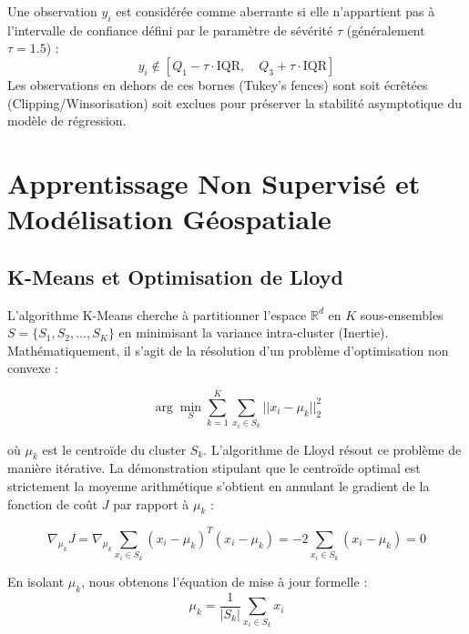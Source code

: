 \documentclass[11pt,a4paper,twoside]{report}
\begin{document}
Une observation $y_i$ est considérée comme aberrante si elle n'appartient pas à l'intervalle de confiance défini par le paramètre de sévérité $\tau$ (généralement $\tau=1.5$) :
\begin{equation}
y_i \notin \left[ Q_1 - \tau \cdot \text{IQR}, \quad Q_3 + \tau \cdot \text{IQR} \right]
\end{equation}
Les observations en dehors de ces bornes (Tukey's fences) sont soit écrêtées (Clipping/Winsorisation) soit exclues pour préserver la stabilité asymptotique du modèle de régression.

\section{Apprentissage Non Supervisé et Modélisation Géospatiale}

\subsection{K-Means et Optimisation de Lloyd}

L'algorithme K-Means \cite{macqueen1967} cherche à partitionner l'espace $\mathbb{R}^d$ en $K$ sous-ensembles $S = \{S_1, S_2, \dots, S_K\}$ en minimisant la variance intra-cluster (Inertie). Mathématiquement, il s'agit de la résolution d'un problème d'optimisation non convexe :

\begin{equation}
\arg\min_{S} \sum_{k=1}^{K} \sum_{x_i \in S_k} || x_i - \mu_k ||^2_2
\end{equation}

où $\mu_k$ est le centroïde du cluster $S_k$. L'algorithme de Lloyd résout ce problème de manière itérative. La démonstration stipulant que le centroïde optimal est strictement la moyenne arithmétique s'obtient en annulant le gradient de la fonction de coût $J$ par rapport à $\mu_k$ :

\begin{equation}
\nabla_{\mu_k} J = \nabla_{\mu_k} \sum_{x_i \in S_k} (x_i - \mu_k)^T (x_i - \mu_k) = -2 \sum_{x_i \in S_k} (x_i - \mu_k) = 0
\end{equation}

En isolant $\mu_k$, nous obtenons l'équation de mise à jour formelle :
\begin{equation}
\mu_k = \frac{1}{|S_k|} \sum_{x_i \in S_k} x_i
\end{equation}
\end{document}
